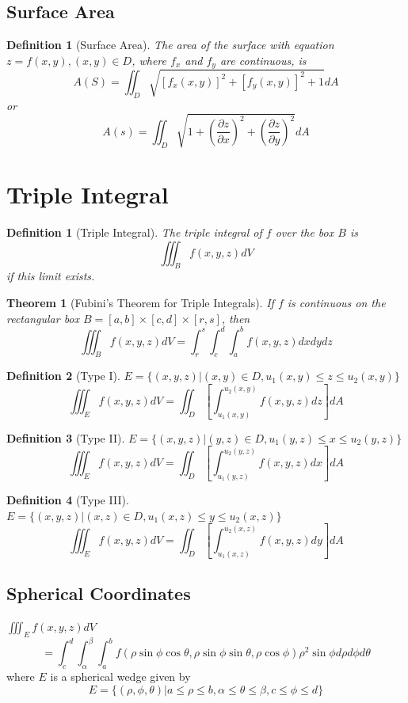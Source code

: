 \documentclass[10pt]{report}
\newtheorem{thm2}{Theorem}[section]
\newtheorem{def2}{Definition}[section]
\newtheorem{def3}{Definition}[subsection]
\begin{document}
\subsection{Surface Area}
\begin{def3}[Surface Area]
The area of the surface with equation $z = f(x,y), (x,y)\in D$, where $f_x$ and $f_y$ are continuous, is
$$A(S) = \iint_D \sqrt{[f_x(x,y)]^2 + [f_y(x,y)]^2 + 1}dA$$
or
$$A(s) = \iint_D \sqrt{1 + \left( \frac{\partial z}{\partial x}\right)^2 +  \left(\frac{\partial z}{\partial y} \right)^2}dA$$
\end{def3}

\section{Triple Integral}
\begin{def2}[Triple Integral]
The triple integral of $f$ over the box $B$ is
$$\iiint_B f(x,y,z)dV$$
if this limit exists.
\end{def2}
\begin{thm2}[Fubini's Theorem for Triple Integrals]
If $f$ is continuous on the rectangular box $B = [a,b] \times [c,d] \times [r,s]$, then
$$\iiint_B f(x,y,z)dV = \int_r^s\int_c^d\int_a^b f(x,y,z) dxdydz$$
\end{thm2}
\begin{def2}[Type I]
$E=\{(x,y,z)|(x,y)\in D, u_1(x,y)\leq z\leq u_2(x,y)\}$
$$\iiint_E f(x,y,z)dV = \iint_D \left[ \int_{u_1(x,y)}^{u_2(x,y)} f(x,y,z)dz\right]dA$$
\end{def2}
\begin{def2}[Type II]
$E=\{(x,y,z)|(y,z)\in D, u_1(y,z)\leq x\leq u_2(y,z)\}$
$$\iiint_E f(x,y,z)dV = \iint_D \left[ \int_{u_1(y,z)}^{u_2(y,z)} f(x,y,z)dx\right]dA$$
\end{def2}
\begin{def2}[Type III]
$E=\{(x,y,z)|(x,z)\in D, u_1(x,z)\leq y\leq u_2(x,z)\}$
$$\iiint_E f(x,y,z)dV = \iint_D \left[ \int_{u_1(x,z)}^{u_2(x,z)} f(x,y,z)dy\right]dA$$
\end{def2}

\subsection{Spherical Coordinates}
$\iiint_E f(x,y,z)dV$
$$=\int_c^d\int_\alpha^\beta\int_a^b f(\rho\sin\phi\cos\theta, \rho\sin\phi\sin\theta, \rho\cos\phi)\rho^2\sin\phi d\rho d\phi d\theta$$
where $E$ is a spherical wedge given by
$$E = \{(\rho, \phi, \theta)| a\leq \rho \leq b, \alpha\leq\theta\leq\beta, c\leq \phi \leq d\}$$
\end{document}
